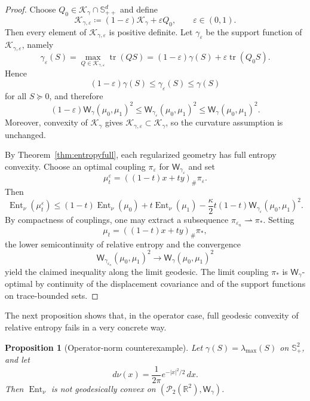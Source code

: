 \documentclass{article}
\newtheorem{proposition}[theorem]{Proposition}
\newcommand{\R}{\mathbb{R}}
\newcommand{\cP}{\mathcal{P}}
\newcommand{\Wg}{\mathsf{W}_{\gamma}}
\newcommand{\tr}{\operatorname{tr}}
\newcommand{\cK}{\mathcal K_\gamma}
\newcommand{\Sppd}{\mathbb S_{++}^d}
\begin{document}
\begin{proof}
Choose $Q_0\in\cK\cap \Sppd$ and define
$$
\mathcal K_{\gamma,\varepsilon}\coloneqq (1-\varepsilon)\cK+\varepsilon Q_0,
\qquad
\varepsilon\in(0,1).
$$
Then every element of $\mathcal K_{\gamma,\varepsilon}$ is positive definite. Let $\gamma_\varepsilon$ be the support function of $\mathcal K_{\gamma,\varepsilon}$, namely
$$
\gamma_\varepsilon(S)=\max_{Q\in\mathcal K_{\gamma,\varepsilon}}\tr(QS)
=(1-\varepsilon)\gamma(S)+\varepsilon\tr(Q_0S).
$$
Hence
$$
(1-\varepsilon)\gamma(S)\le \gamma_\varepsilon(S)\le \gamma(S)
$$
for all $S\succeq 0$, and therefore
$$
(1-\varepsilon)\Wg(\mu_0,\mu_1)^2
\le
\mathsf W_{\gamma_\varepsilon}(\mu_0,\mu_1)^2
\le
\Wg(\mu_0,\mu_1)^2.
$$
Moreover, convexity of $\cK$ gives
$\mathcal K_{\gamma,\varepsilon}\subset\cK$, so the curvature assumption is
unchanged.

By Theorem~\ref{thm:entropyfull}, each regularized geometry has full entropy convexity. Choose an optimal coupling $\pi_\varepsilon$ for $\mathsf W_{\gamma_\varepsilon}$ and set
$$
\mu_t^\varepsilon=((1-t)x+ty)_\#\pi_\varepsilon.
$$
Then
$$
\operatorname{Ent}_\nu(\mu_t^\varepsilon)
\le
(1-t)\operatorname{Ent}_\nu(\mu_0)+t\operatorname{Ent}_\nu(\mu_1)
-\frac{\kappa}{2}t(1-t)\mathsf W_{\gamma_\varepsilon}(\mu_0,\mu_1)^2.
$$
By compactness of couplings, one may extract a subsequence $\pi_{\varepsilon_n}\rightharpoonup \pi_*$. Setting
$$
\mu_t=((1-t)x+ty)_\#\pi_*,
$$
the lower semicontinuity of relative entropy and the convergence
$$
\mathsf W_{\gamma_{\varepsilon_n}}(\mu_0,\mu_1)^2\to \Wg(\mu_0,\mu_1)^2
$$
yield the claimed inequality along the limit geodesic. The limit coupling $\pi_*$ is $\Wg$-optimal by continuity of the displacement covariance and of the support functions on trace-bounded sets.
\end{proof}

The next proposition shows that, in the operator case, full geodesic convexity of relative entropy fails in a very concrete way.
\begin{proposition}[Operator-norm counterexample]
\label{prop:entropy-counterexample}
Let $\gamma(S)=\lambda_{\max}(S)$ on $\mathbb S_+^2$, and let
$$
d\nu(x)=\frac{1}{2\pi}e^{-|x|^2/2}\,dx.
$$
Then $\operatorname{Ent}_\nu$ is not geodesically convex on $(\cP_2(\R^2),\mathsf W_{\gamma})$.
\end{proposition}
\end{document}
